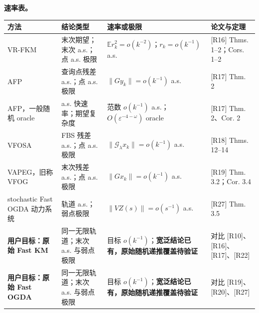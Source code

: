 \documentclass[
  chinese,
  10pt,
  a4paper,
]{article}
\newcounter{none} %
\begin{document}
\textbf{速率表。}

{\def\LTcaptype{none} %
\begin{longtable}[]{@{}
  >{\raggedright\arraybackslash}p{}
  >{\raggedright\arraybackslash}p{}
  >{\raggedright\arraybackslash}p{}
  >{\raggedright\arraybackslash}p{}@{}}
\toprule\noalign{}
\begin{minipage}[b]{\linewidth}\raggedright
方法
\end{minipage} & \begin{minipage}[b]{\linewidth}\raggedright
结论类型
\end{minipage} & \begin{minipage}[b]{\linewidth}\raggedright
速率或极限
\end{minipage} & \begin{minipage}[b]{\linewidth}\raggedright
论文与定理
\end{minipage} \\
\midrule\noalign{}
\endhead
\bottomrule\noalign{}
\endlastfoot
VR-FKM & 末次期望；末次 a.s.；点 a.s. 极限 &
\(\mathbb E r_k^2=o(k^{-2})\)；\(r_k=o(k^{-1})\) a.s. & {[}R16{]} Thms.
1--2；Cors. 1--2 \\
AFP & 查询点残差 a.s.；点 a.s. 极限 & \(\lVert Gy_k\rVert=o(k^{-1})\)
a.s. & {[}R17{]} Thm. 2 \\
AFP，一般随机 oracle & a.s. 快速率；期望复杂度 & 范数 \(o(k^{-1})\)
a.s.；\(O(\varepsilon^{-4-\omega})\) oracle & {[}R17{]} Thm. 2、Cor.
2 \\
VFOSA & FBS 残差 a.s.；点 a.s. 极限 &
\(\lVert\mathcal G_\lambda x_k\rVert=o(k^{-1})\) a.s. & {[}R18{]} Thms.
12--14 \\
VAPEG，旧称 VFOG & 末次残差 a.s.；点 a.s. 极限 &
\(\lVert Gx_k\rVert=o(k^{-1})\) a.s. & {[}R19{]} Thm. 3.2；Cor. 3.4 \\
stochastic Fast OGDA 动力系统 & 轨道 a.s.；弱点极限 &
\(\lVert VZ(s)\rVert=o(s^{-1})\) a.s. & {[}R27{]} Thm. 3.5 \\
\textbf{用户目标：原始 Fast KM} & 同一无限轨道；末次 a.s. 与弱点极限 &
目标 \(o(k^{-1})\)；\textbf{宽泛结论已有，原始随机递推覆盖待验证} & 对比
{[}R10{]}、{[}R16{]}、{[}R17{]}、{[}R22{]} \\
\textbf{用户目标：原始 Fast OGDA} & 同一无限轨道；末次 a.s. 与弱点极限 &
目标 \(o(k^{-1})\)；\textbf{宽泛结论已有，原始随机递推覆盖待验证} & 对比
{[}R19{]}、{[}R20{]}、{[}R27{]} \\
\end{longtable}
}
\end{document}
